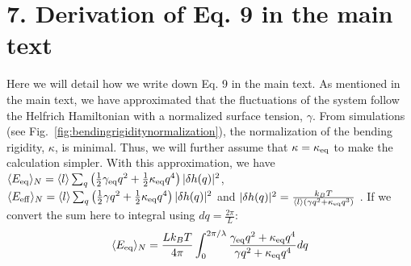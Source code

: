 \documentclass[amsmath,preprintnumbers,10pt,nofootinbib,prl,twocolumn]{revtex4-1}
\begin{document}
\section{7. Derivation of Eq. 9 in the main text}
Here we will detail how we write down Eq. 9 in the main text. As mentioned in the main text, we have approximated that the fluctuations of the system follow the Helfrich Hamiltonian with a normalized surface tension, $\gamma$. From simulations (see Fig.~\ref{fig:bendingrigiditynormalization}), the normalization of the bending rigidity, $\kappa$, is minimal. Thus, we will further assume that $\kappa= \kappa_{\rm eq}$ to make the calculation simpler. With this approximation, we have $\langle E_{\rm eq}\rangle _N=\langle l \rangle\sum_q\left(\frac{1}{2}\gamma_{\rm eq} q^2+\frac{1}{2}\kappa_{\rm eq} q^4\right)|\delta h(q)|^2$, $\langle E_{\rm eff}\rangle_N=\langle l \rangle\sum_q\left(\frac{1}{2}\gamma q^2+\frac{1}{2}\kappa_{\rm eq} q^4\right)|\delta h(q)|^2$ and $|\delta h(q)|^2=\frac{k_B T}{\langle l \rangle  \left(\gamma q^2+\kappa_{\rm eq}q^3\right)}$ . If we convert the sum here to integral using $dq=\frac{2\pi}{L}$:
\begin{equation}
    \langle E_{\rm eq}\rangle_N=\frac{L k_BT}{4\pi}\int_0^{2\pi/\lambda}\frac{\gamma_{\rm eq}q^2+\kappa_{\rm eq}q^4}{\gamma q^2+\kappa_{\rm eq}q^4}dq
\end{equation}
\end{document}
